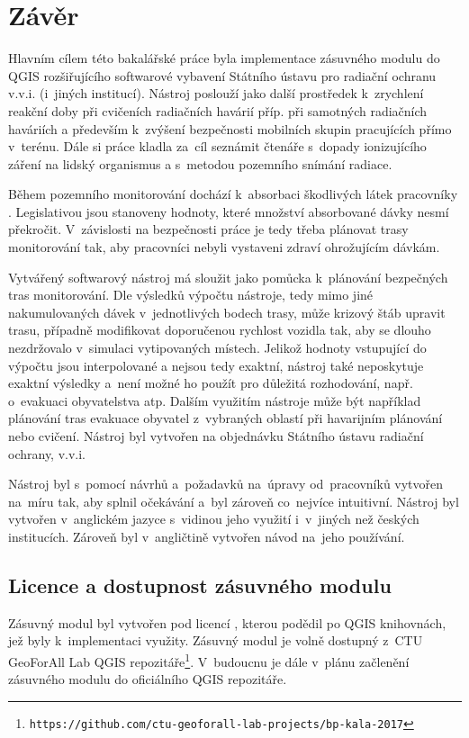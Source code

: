 \chapter{Závěr}
\label{5-zaver}

Hlavním cílem této bakalářské práce byla implementace zásuvného modulu
do QGIS rozšiřujícího softwarové vybavení Státního ústavu pro radiační
ochranu v.v.i. (i~jiných institucí). Nástroj poslouží jako další
prostředek k~zrychlení reakční doby při cvičeních radiačních havárií
příp. při samotných radiačních haváriích a především k~zvýšení
bezpečnosti mobilních skupin pracujících přímo v~terénu. Dále si práce
kladla za~cíl seznámit čtenáře s~dopady ionizujícího záření na lidský
organismus a s~metodou pozemního snímání radiace.

Během pozemního monitorování dochází
k~absorbaci škodlivých látek pracovníky . Legislativou jsou
stanoveny hodnoty, které množství absorbované dávky nesmí
překročit. V~závislosti na bezpečnosti práce je tedy třeba plánovat
trasy monitorování tak, aby pracovníci  nebyli vystaveni zdraví
ohrožujícím dávkám.

Vytvářený softwarový nástroj má sloužit jako pomůcka k~plánování bezpečných tras
monitorování. Dle výsledků výpočtu nástroje, tedy mimo jiné
nakumulovaných dávek v~jednotlivých bodech trasy, může krizový štáb
upravit trasu, případně mo\-difikovat doporučenou rychlost vozidla tak,
aby se dlouho nezdržovalo v~simulaci vytipovaných 
místech. Jelikož hodnoty vstupující do výpočtu jsou interpolované a
nejsou tedy exaktní, nástroj také neposkytuje exaktní výsledky a~není
možné ho použít pro důležitá rozhodování, např. o~evakuaci
obyvatelstva atp. Dalším využitím nástroje může být například
plánování tras evakuace obyvatel z~vybraných oblastí při havarijním
plánování nebo cvičení. Nástroj byl vytvořen na objednávku Státního
ústavu radiační ochrany, v.v.i.

Nástroj byl s~pomocí návrhů a~požadavků na~úpravy od~pracovníků
 vytvořen na~míru tak, aby splnil očekávání a~byl zároveň 
co~nejvíce intuitivní. Nástroj byl vytvořen v~anglickém jazyce s~vidinou
jeho využití i~v~jiných než českých institucích. Zároveň byl
v~angličtině vytvořen návod na~jeho používání.

\section{Licence a dostupnost zásuvného modulu} Zásuvný modul byl
vytvořen pod licencí , kterou podědil po QGIS knihovnách,
jež byly k~implementaci využity. Zásuvný modul je volně dostupný z~CTU
GeoForAll Lab QGIS
repozitáře\footnote{\texttt{https://github.com/ctu-geoforall-lab-projects/bp-kala-2017}}. V~budoucnu
je dále v~plánu začlenění zásuvného modulu do oficiálního QGIS
repozitáře.

 



